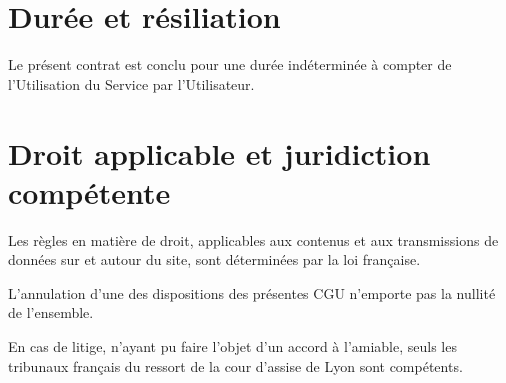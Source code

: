 \section{Durée et résiliation}

Le présent contrat est conclu pour une durée indéterminée à compter de l'Utilisation du Service par l'Utilisateur.


\section{Droit applicable et juridiction compétente}

Les règles en matière de droit, applicables aux contenus et aux transmissions de données sur et autour du site, sont déterminées par la loi française.

L'annulation d'une des dispositions des présentes CGU n'emporte pas la nullité de l'ensemble.

En cas de litige, n'ayant pu faire l'objet d'un accord à l'amiable, seuls les tribunaux français du ressort de la cour d'assise de Lyon sont compétents.